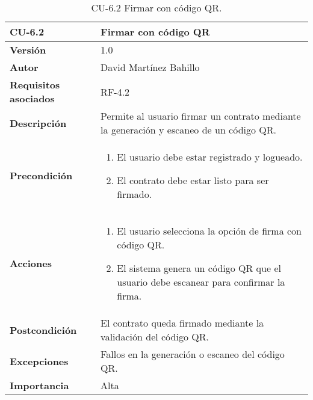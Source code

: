 \begin{table}[p]
	\centering
	\begin{tabularx}{\linewidth}{ p{} p{} }
		\toprule
		\textbf{CU-6.2}  & \textbf{Firmar con código QR}\\
		\midrule
		\textbf{Versión}              & 1.0    \\
		\textbf{Autor}                & David Martínez Bahillo \\
		\textbf{Requisitos asociados} & RF-4.2 \\
		\textbf{Descripción}          & Permite al usuario firmar un contrato mediante la generación y escaneo de un código QR. \\
		\textbf{Precondición}         &  
		\begin{enumerate}
			\def\labelenumi{\arabic{enumi}.}
			\tightlist
			\item El usuario debe estar registrado y logueado.
			\item El contrato debe estar listo para ser firmado.
		\end{enumerate}\\
		\textbf{Acciones}             &
		\begin{enumerate}
			\def\labelenumi{\arabic{enumi}.}
			\tightlist
			\item El usuario selecciona la opción de firma con código QR.
			\item El sistema genera un código QR que el usuario debe escanear para confirmar la firma.
		\end{enumerate}\\
		\textbf{Postcondición}        & El contrato queda firmado mediante la validación del código QR. \\
		\textbf{Excepciones}          & Fallos en la generación o escaneo del código QR. \\
		\textbf{Importancia}          & Alta  \\
		\bottomrule
	\end{tabularx}
	\caption{CU-6.2 Firmar con código QR.}
\end{table}


